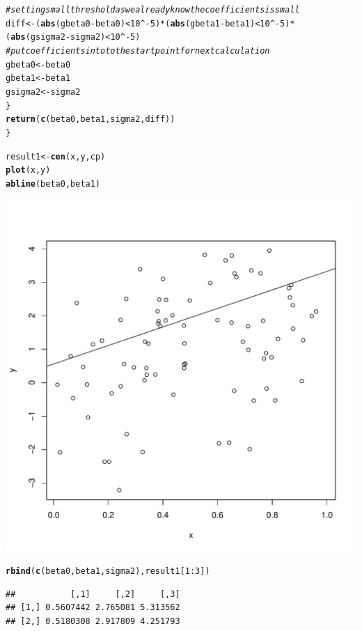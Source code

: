 \documentclass{article}\usepackage[]{graphicx}\usepackage[]{color}
\makeatletter
\def\maxwidth{ %
  \ifdim\Gin@nat@width>\linewidth
    \linewidth
  \else
    \Gin@nat@width
  \fi
}
\newcommand{\hlnum}[1]{\textcolor[rgb]{0.686,0.059,0.569}{#1}}%
\newcommand{\hlcom}[1]{\textcolor[rgb]{0.678,0.584,0.686}{\textit{#1}}}%
\newcommand{\hlopt}[1]{\textcolor[rgb]{0,0,0}{#1}}%
\newcommand{\hlstd}[1]{\textcolor[rgb]{0.345,0.345,0.345}{#1}}%
\newcommand{\hlkwb}[1]{\textcolor[rgb]{0.69,0.353,0.396}{#1}}%
\newcommand{\hlkwd}[1]{\textcolor[rgb]{0.737,0.353,0.396}{\textbf{#1}}}%
\newenvironment{kframe}{%
 \def\at@end@of@kframe{}%
 \ifinner\ifhmode%
  \def\at@end@of@kframe{\end{minipage}}%
  \begin{minipage}{\columnwidth}%
 \fi\fi%
 \def\FrameCommand##1{\hskip\@totalleftmargin \hskip-\fboxsep
 \colorbox{shadecolor}{##1}\hskip-\fboxsep
     \hskip-\linewidth \hskip-\@totalleftmargin \hskip\columnwidth}%
 \MakeFramed {\advance\hsize-\width
   \@totalleftmargin\z@ \linewidth\hsize
   \@setminipage}}%
 {\par\unskip\endMakeFramed%
 \at@end@of@kframe}
\newenvironment{knitrout}{}{} %
\makeatother
\begin{document}
\begin{knitrout}
\begin{kframe}
\begin{alltt}
      \hlcom{# setting small threshold as we already know the coefficients is small}
      \hlstd{diff} \hlkwb{<-} \hlstd{(}\hlkwd{abs}\hlstd{(gbeta0}\hlopt{-}\hlstd{beta0)}\hlopt{<}\hlnum{10}\hlopt{^-}\hlnum{5}\hlstd{)}\hlopt{*}\hlstd{(}\hlkwd{abs}\hlstd{(gbeta1}\hlopt{-}\hlstd{beta1)}\hlopt{<}\hlnum{10}\hlopt{^-}\hlnum{5}\hlstd{)}\hlopt{*}\hlstd{(}\hlkwd{abs}\hlstd{(gsigma2}\hlopt{-}\hlstd{sigma2)}\hlopt{<}\hlnum{10}\hlopt{^-}\hlnum{5}\hlstd{)}
      \hlcom{#put coefficients into to the start point for next calculation}
      \hlstd{gbeta0} \hlkwb{<-} \hlstd{beta0}
      \hlstd{gbeta1} \hlkwb{<-} \hlstd{beta1}
      \hlstd{gsigma2} \hlkwb{<-} \hlstd{sigma2}
    \hlstd{\}}
    \hlkwd{return}\hlstd{(}\hlkwd{c}\hlstd{(beta0,beta1,sigma2,diff))}
\hlstd{\}}

\hlstd{result1} \hlkwb{<-} \hlkwd{cen}\hlstd{(x,y,cp)}
\hlkwd{plot}\hlstd{(x,y)}
\hlkwd{abline}\hlstd{(beta0,beta1)}
\end{alltt}
\end{kframe}
\includegraphics[width=\maxwidth]{figure/unnamed-chunk-5-1} 
\begin{kframe}\begin{alltt}
\hlkwd{rbind}\hlstd{(}\hlkwd{c}\hlstd{(beta0,beta1, sigma2),result1[}\hlnum{1}\hlopt{:}\hlnum{3}\hlstd{])}
\end{alltt}
\begin{verbatim}
##           [,1]     [,2]     [,3]
## [1,] 0.5607442 2.765081 5.313562
## [2,] 0.5180308 2.917809 4.251793
\end{verbatim}
\end{kframe}
\end{knitrout}
\end{document}
